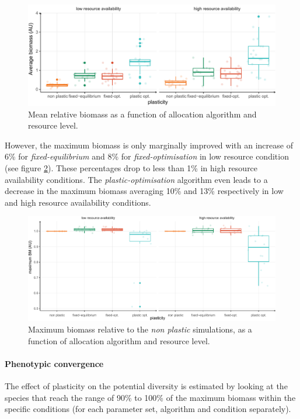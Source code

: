 \begin{figure}
\includegraphics[width = \textwidth]{./2_PP/Figures/Landscape/plot_BM_allocation.pdf}
\caption{Mean relative biomass as a function of allocation algorithm and resource level.}\label{fig:mean_BM_pl}
\end{figure}

However, the maximum biomass is only marginally improved with an increase of 6\% for \textit{fixed-equilibrium} and 8\% for \textit{fixed-optimisation} in low resource condition (see figure \ref{fig:max_BM_pl}). These percentages drop to less than 1\% in high resource availability conditions. The \textit{plastic-optimisation} algorithm even leads to a decrease in the maximum biomass averaging 10\% and 13\% respectively in low and high resource availability conditions.

\begin{figure}
\includegraphics[width = \textwidth]{./2_PP/Figures/Landscape/plot_maxBM_allocation.pdf}
\caption{Maximum biomass relative to the \textit{non plastic} simulations, as a function of allocation algorithm and resource level.}\label{fig:max_BM_pl}
\end{figure}

\paragraph{Phenotypic convergence}

The effect of plasticity on the potential diversity is estimated by looking at the species that reach the range of 90\% to 100\% of the maximum biomass within the specific conditions (for each parameter set, algorithm and condition separately).

